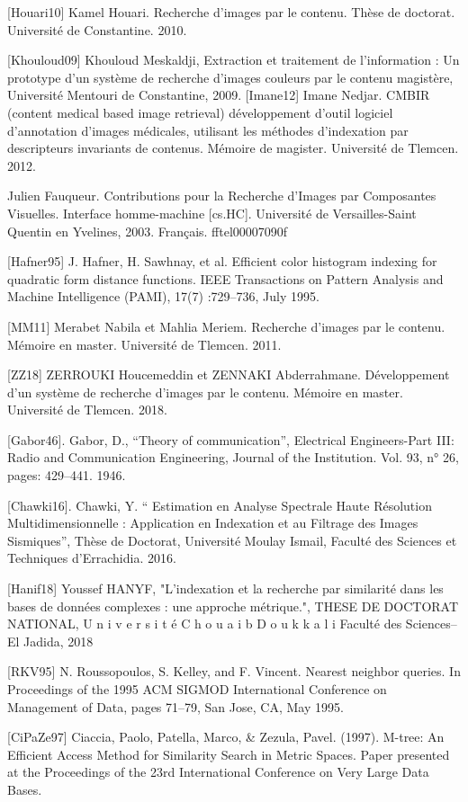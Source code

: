 [Houari10] Kamel Houari. Recherche d’images par le contenu. Thèse de doctorat.
Université de Constantine. 2010.

[Khouloud09] Khouloud Meskaldji, Extraction et traitement de l’information : Un prototype d’un
système de recherche d’images couleurs par le contenu magistère, Université Mentouri de
Constantine, 2009.
[Imane12] Imane Nedjar. CMBIR (content medical based image retrieval)
développement d’outil logiciel d’annotation d’images médicales, utilisant les
méthodes d’indexation par descripteurs invariants de contenus. Mémoire de
magister. Université de Tlemcen. 2012.

Julien Fauqueur. Contributions pour la Recherche d’Images par Composantes Visuelles. Interface
homme-machine [cs.HC]. Université de Versailles-Saint Quentin en Yvelines, 2003. Français. fftel00007090f

[Hafner95] J. Hafner, H. Sawhnay, et al. Efficient color histogram indexing for quadratic
form distance functions. IEEE Transactions on Pattern Analysis and Machine
Intelligence (PAMI), 17(7) :729–736, July 1995.

[MM11] Merabet Nabila et Mahlia Meriem. Recherche d’images par le contenu.
Mémoire en master. Université de Tlemcen. 2011.

[ZZ18]  ZERROUKI Houcemeddin et ZENNAKI Abderrahmane. Développement d’un système de recherche
d’images par le contenu. Mémoire en master. Université de Tlemcen. 2018.

[Gabor46]. Gabor, D., “Theory of communication”, Electrical Engineers-Part III: Radio and
Communication Engineering, Journal of the Institution. Vol. 93, n° 26, pages: 429–441.
1946.

[Chawki16]. Chawki, Y. “ Estimation en Analyse Spectrale Haute Résolution Multidimensionnelle : Application en Indexation et au Filtrage des Images Sismiques”, Thèse de Doctorat,
Université Moulay Ismail, Faculté des Sciences et Techniques d’Errachidia. 2016.

[Hanif18] Youssef HANYF, "L'indexation et la recherche par similarité dans les
bases de données complexes : une approche
métrique.", THESE DE DOCTORAT NATIONAL, U n i v e r s i t é C h o u a i b D o u k k a l i
Faculté des Sciences– El Jadida, 2018

[RKV95] N. Roussopoulos, S. Kelley, and F. Vincent. Nearest neighbor queries. In
Proceedings of the 1995 ACM SIGMOD International Conference on Management of Data, pages 71–79, San Jose, CA, May 1995. 

[CiPaZe97] Ciaccia, Paolo, Patella, Marco, \& Zezula, Pavel. (1997). M-tree: An Efficient Access Method for
Similarity Search in Metric Spaces. Paper presented at the Proceedings of the 23rd
International Conference on Very Large Data Bases.

